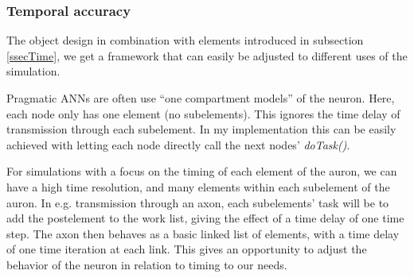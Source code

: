 		
		


		\subsubsection{Temporal accuracy}
		\label{sssecTemporalAccuracy}
		The object design in combination with elements introduced in subsection \ref{ssecTime}, we get a framework that can easily be adjusted to different uses of the simulation. 
		
		Pragmatic ANNs are often use ``one compartment models'' of the neuron.%
		Here, each node only has one element (no subelements). This ignores the time delay of transmission through each subelement. 
		In my implementation this can be easily achieved with letting each node directly call the next nodes' \emph{\small{doTask()}}. 

		
		For simulations with a focus on the timing of each element of the auron, we can have a high time resolution, and many elements within each subelement of the auron.
		In e.g. transmission through an axon, each subelements' task will be to add the postelement to the work list,%
			giving the effect of a time delay of one time step. 
		The axon then behaves as a basic linked list of elements, with a time delay of one time iteration at each link.
		This gives an opportunity to adjust the behavior of the neuron in relation to timing to our needs.



